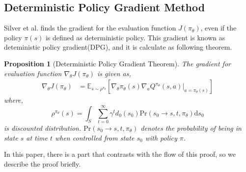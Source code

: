 \documentclass[english, dvipdfmx]{ampmt}             %
\newcommand{\expect}{\mathbb{E}}
\newtheorem{prop.}{Proposition}
\begin{document}
\subsection{Deterministic Policy Gradient Method}
Silver et al.\cite{DPG} finds the gradient for the evaluation function $J(\pi_{\theta})$, even if the policy $\pi(s)$ is defined as deterministic policy. This gradient is known as deteministic policy gradient(DPG), and it is calculate as following theorem.
\begin{prop.}[Deterministic Policy Gradient Theorem]
The gradient for evaluation function $\nabla_{\theta}J(\pi_{\theta})$ is given as, 
\begin{align}
	\nabla_{\theta}J(\pi_{\theta}) &= \expect_{s\sim\rho^{\pi_{\theta}}}[
	\nabla_{\theta}\pi_{\theta}(s)\nabla_{a}Q^{\pi_{\theta}}(s, a)|_{a=\pi_{\theta}(s)}] \label{true_pg} 
\end{align}
where, 
\begin{equation}
	\rho^{\pi_{\theta}}(s) = \int_{S}\sum_{t=0}^{\infty}\gamma^td_0(s_0)\textrm{Pr}(s_0\to s, t,  \pi_{\theta})\textrm{d}s_0
\end{equation}
is discounted distribution. $\textrm{Pr}(s_0\to s, t,  \pi_{\theta})$ denotes the probability of being in state $s$ at time $t$ when controlled from state $s_0$ with policy $\pi$.
\end{prop.}
In this paper, there is a part that contrasts with the flow of this proof, so we describe the proof briefly.
\end{document}

